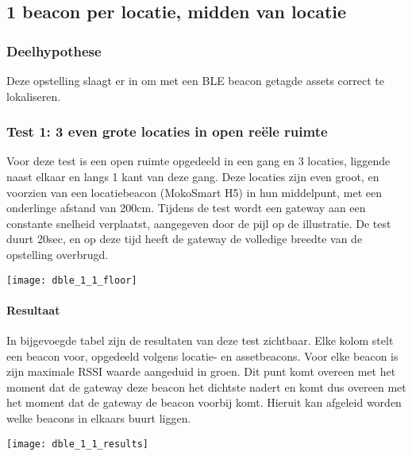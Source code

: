 \subsection{1 beacon per locatie, midden van locatie}
\subsubsection{Deelhypothese}
Deze opstelling slaagt er in om met een BLE beacon getagde assets correct te lokaliseren.

\subsubsection{Test 1: 3 even grote locaties in open reële ruimte}
\begin{minipage}{0.55\textwidth}
Voor deze test is een open ruimte opgedeeld in een gang en 3 locaties, liggende naast elkaar en langs 1 kant van deze gang. Deze locaties zijn even groot, en voorzien van een locatiebeacon (MokoSmart H5) in hun middelpunt, met een onderlinge afstand van 200cm. Tijdens de test wordt een gateway aan een constante snelheid verplaatst, aangegeven door de pijl op de illustratie. De test duurt 20sec, en op deze tijd heeft de gateway de volledige breedte van de opstelling overbrugd. 
\end{minipage}
\hfill
\begin{minipage}{0.42\textwidth}
	\texttt{[image: dble\_1\_1\_floor]}
\end{minipage}

\paragraph{Resultaat}
\begin{minipage}{0.42\textwidth}
In bijgevoegde tabel zijn de resultaten van deze test zichtbaar. Elke kolom stelt een beacon voor, opgedeeld volgens locatie- en assetbeacons. Voor elke beacon is zijn maximale RSSI waarde aangeduid in groen. Dit punt komt overeen met het moment dat de gateway deze beacon het dichtste nadert en komt dus overeen met het moment dat de gateway de beacon voorbij komt. Hieruit kan afgeleid worden welke beacons in elkaars buurt liggen. 
\end{minipage}
\hfill
\begin{minipage}{0.55\textwidth}
	\texttt{[image: dble\_1\_1\_results]}
\end{minipage}

